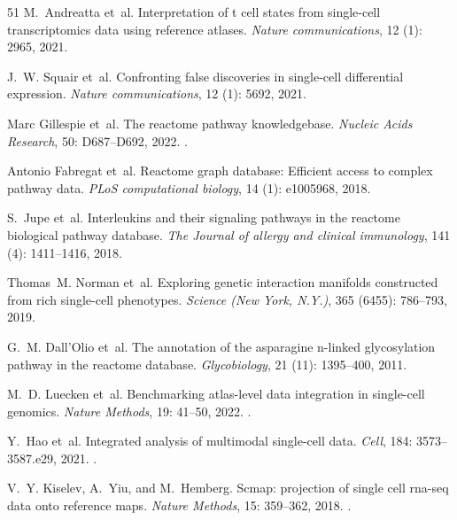 \documentclass[10pt]{article}
\begin{document}
\begin{thebibliography}{51}
M.~Andreatta et~al.
\newblock Interpretation of t cell states from single-cell transcriptomics data
  using reference atlases.
\newblock \emph{Nature communications}, 12 (1): 2965, 2021.

J.~W. Squair et~al.
\newblock Confronting false discoveries in single-cell differential expression.
\newblock \emph{Nature communications}, 12 (1): 5692, 2021.

Marc Gillespie et~al.
\newblock The reactome pathway knowledgebase.
\newblock \emph{Nucleic Acids Research}, 50: D687--D692, 2022.
\newblock {}.

Antonio Fabregat et~al.
\newblock Reactome graph database: Efficient access to complex pathway data.
\newblock \emph{PLoS computational biology}, 14 (1):
  e1005968, 2018.

S.~Jupe et~al.
\newblock Interleukins and their signaling pathways in the reactome biological
  pathway database.
\newblock \emph{The Journal of allergy and clinical immunology}, 141
  (4): 1411--1416, 2018.

Thomas~M. Norman et~al.
\newblock Exploring genetic interaction manifolds constructed from rich
  single-cell phenotypes.
\newblock \emph{Science (New York, N.Y.)}, 365 (6455):
  786--793, 2019.

G.~M. Dall'Olio et~al.
\newblock The annotation of the asparagine n-linked glycosylation pathway in
  the reactome database.
\newblock \emph{Glycobiology}, 21 (11): 1395--400, 2011.

M.~D. Luecken et~al.
\newblock Benchmarking atlas-level data integration in single-cell genomics.
\newblock \emph{Nature Methods}, 19: 41--50, 2022.
\newblock {}.

Y.~Hao et~al.
\newblock Integrated analysis of multimodal single-cell data.
\newblock \emph{Cell}, 184: 3573--3587.e29, 2021.
\newblock {}.

V.~Y. Kiselev, A.~Yiu, and M.~Hemberg.
\newblock Scmap: projection of single cell rna-seq data onto reference maps.
\newblock \emph{Nature Methods}, 15: 359--362, 2018.
\newblock {}.


\end{thebibliography}
\end{document}
